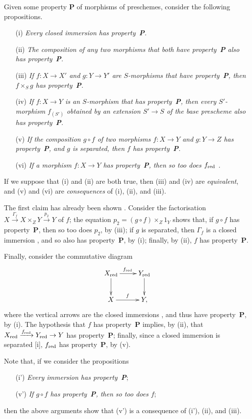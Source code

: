\begin{remark}[5.5.12]
\label{I.5.5.12}
Given some property \textbf{P} of morphisms of preschemes, consider the following propositions.
\begin{enumerate}
  \item[(i)] \emph{Every closed immersion has property~\textbf{P}.}
  \item[(ii)] \emph{The composition of any two morphisms that both have property~\textbf{P} also has property~\textbf{P}.}
  \item[(iii)] \emph{If $f:X\to X'$ and $g:Y\to Y'$ are $S$-morphisms that have property~\textbf{P}, then $f\times_S g$ has property~\textbf{P}.}
  \item[(iv)] \emph{If $f:X\to Y$ is an $S$-morphism that has property~\textbf{P}, then every $S'$-morphism $f_{(S')}$ obtained by an extension $S'\to S$ of the base prescheme also has property~\textbf{P}.}
  \item[(v)] \emph{If the composition $g\circ f$ of two morphisms $f:X\to Y$ and $g:Y\to Z$ has property~\textbf{P}, and $g$ is separated, then $f$ has property~\textbf{P}.}
  \item[(vi)] \emph{If a morphism $f:X\to Y$ has property~\textbf{P}, then so too does $f_{\mathrm{red}}$ .}
\end{enumerate}
If we suppose that (i) and (ii) are both true, then (iii) and (iv) are \emph{equivalent}, and (v) and (vi) are \emph{consequences} of (i), (ii), and (iii).

The first claim has already been shown .
Consider the factorisation  $X\xrightarrow{\Gamma_f}X\times_Z Y\xrightarrow{p_2}Y$ of $f$;
the equation $p_2=(g\circ f)\times_Z 1_Y$ shows that, if $g\circ f$ has property~\textbf{P}, then so too does $p_2$, by (iii);
if $g$ is separated, then $\Gamma_f$ is a closed immersion , and so also has property~\textbf{P}, by (i);
finally, by (ii), $f$ has property~\textbf{P}.

Finally, consider the commutative diagram
\[
  \xymatrix{
    X_\red\ar[r]^{f_\red}\ar[d] &
    Y_\red\ar[d]\\
    X\ar[r]^f &
    Y,
  }
\]
where the vertical arrows are the closed immersions , and thus have property~\textbf{P}, by (i).
The hypothesis that $f$ has property~\textbf{P} implies, by (ii), that $X_\red\xrightarrow{f_\red}Y_\red\to Y$ has property~\textbf{P};
finally, since a closed immersion is separated [i], $f_{\mathrm{red}}$ has property~\textbf{P}, by (v).

Note that, if we consider the propositions
\begin{enumerate}
  \item[(i')] \emph{Every immersion has property~\textbf{P}};
  \item[(v')] \emph{If $g\circ f$ has property~\textbf{P}, then so too does $f$};
\end{enumerate}
then the above arguments show that (v') is a consequence of (i'), (ii), and (iii).
\end{remark}

